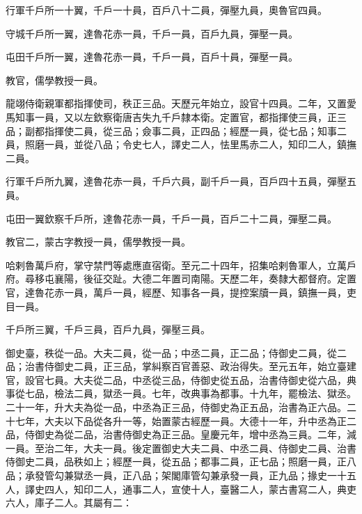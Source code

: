 \begin{pinyinscope}
 行軍千戶所一十翼，千戶一十員，百戶八十二員，彈壓九員，奧魯官四員。



 守城千戶所一翼，達魯花赤一員，千戶一員，百戶九員，彈壓一員。



 屯田千戶所一翼，達魯花赤一員，千戶一員，百戶十員，彈壓一員。



 教官，儒學教授一員。



 龍翊侍衛親軍都指揮使司，秩正三品。天歷元年始立，設官十四員。二年，又置愛馬知事一員，又以左欽察衛唐吉失九千戶隸本衛。定置官，都指揮使三員，正三品；副都指揮使二員，從三品；僉事二員，正四品；經歷一員，從七品；知事二員，照磨一員，並從八品；令史七人，譯史二人，怯里馬赤二人，知印二人，鎮撫二員。



 行軍千戶所九翼，達魯花赤一員，千戶六員，副千戶一員，百戶四十五員，彈壓五員。



 屯田一翼欽察千戶所，達魯花赤一員，千戶一員，百戶二十二員，彈壓二員。



 教官二，蒙古字教授一員，儒學教授一員。



 哈剌魯萬戶府，掌守禁門等處應直宿衛。至元二十四年，招集哈剌魯軍人，立萬戶府。尋移屯襄陽，後征交趾。大德二年置司南陽。天歷二年，奏隸大都督府。定置官，達魯花赤一員，萬戶一員，經歷、知事各一員，提控案牘一員，鎮撫一員，吏目一員。



 千戶所三翼，千戶三員，百戶九員，彈壓三員。



 御史臺，秩從一品。大夫二員，從一品；中丞二員，正二品；侍御史二員，從二品；治書侍御史二員，正三品，掌糾察百官善惡、政治得失。至元五年，始立臺建官，設官七員。大夫從二品，中丞從三品，侍御史從五品，治書侍御史從六品，典事從七品，檢法二員，獄丞一員。七年，改典事為都事。十九年，罷檢法、獄丞。二十一年，升大夫為從一品，中丞為正三品，侍御史為正五品，治書為正六品。二十七年，大夫以下品從各升一等，始置蒙古經歷一員。大德十一年，升中丞為正二品，侍御史為從二品，治書侍御史為正三品。皇慶元年，增中丞為三員。二年，減一員。至治二年，大夫一員。後定置御史大夫二員、中丞二員、侍御史二員、治書侍御史二員，品秩如上；經歷一員，從五品；都事二員，正七品；照磨一員，正八品；承發管勾兼獄丞一員，正八品；架閣庫管勾兼承發一員，正九品；掾史一十五人，譯史四人，知印二人，通事二人，宣使十人，臺醫二人，蒙古書寫二人，典吏六人，庫子二人。其屬有二：




\end{pinyinscope}
